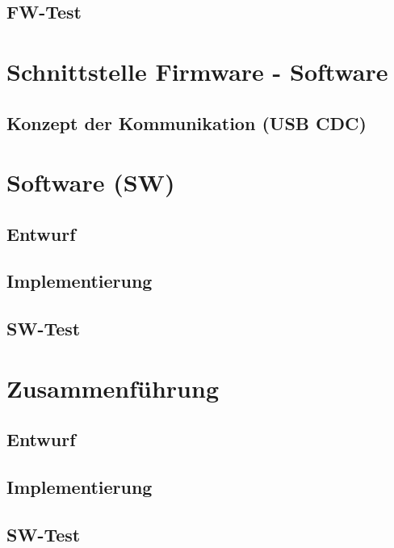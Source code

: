 \documentclass[a4paper, portrait, 12pt]{scrartcl} %
\begin{document}
\pagebreak

\subsection{FW-Test}

\pagebreak

\section{Schnittstelle Firmware - Software}

\subsection{Konzept der Kommunikation (USB CDC)}

\pagebreak

\section{Software (SW)}
\subsection{Entwurf}

\pagebreak
\subsection{Implementierung}

\pagebreak

\subsection{SW-Test}

\pagebreak

\section{Zusammenführung}
\subsection{Entwurf}
\subsection{Implementierung}
\subsection{SW-Test}
\end{document}
